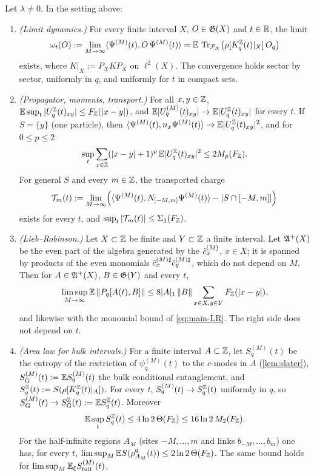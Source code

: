 \begin{theorem}\label{thm:infvol}
Let $\lambda\neq0$.  In the setting above:
\begin{enumerate}[label=(\alph*)]
\item \emph{(Limit dynamics.)}  For every finite interval $X$, $O\in\mathfrak{G}(X)$ and $t\in\mathbb{R}$, the limit
\[
  \omega_t(O):=\lim_{M\to\infty}\langle\Psi^{(M)}(t),O\,\Psi^{(M)}(t)\rangle=\mathbb{E}\,\operatorname{Tr}_{\mathcal{F}_X}\bigl(\rho[K^{\mathbb{Z}}_q(t)|_X]\,O_q\bigr)
\]
exists, where $K|_X:=P_XKP_X$ on $\ell^2(X)$.  The convergence holds sector by sector, uniformly in $q$, and
uniformly for $t$ in compact sets.
\item \emph{(Propagator, moments, transport.)}  For all $x,y\in\mathbb{Z}$, $\mathbb{E}\sup_t|U^{\mathbb{Z}}_q(t)_{xy}|\le F_{\mathbb{Z}}(|x-y|)$, and
$\mathbb{E}|U^{(M)}_q(t)_{xy}|\to\mathbb{E}|U^{\mathbb{Z}}_q(t)_{xy}|$ for every $t$.  If $S=\{y\}$ (one particle), then
$\langle\Psi^{(M)}(t),n_x\Psi^{(M)}(t)\rangle\to\mathbb{E}|U^{\mathbb{Z}}_q(t)_{xy}|^2$, and for $0\le p\le2$
\[
  \sup_t\sum_{x\in\mathbb{Z}}(|x-y|+1)^p\,\mathbb{E}|U^{\mathbb{Z}}_q(t)_{xy}|^2\le2M_p(F_{\mathbb{Z}}).
\]  For general $S$ and every $m\in\mathbb{Z}$, the
transported charge
\[
  \mathcal T_m(t):=\lim_{M\to\infty}\Bigl(\langle\Psi^{(M)}(t),N_{[-M,m]}\Psi^{(M)}(t)\rangle-|S\cap[-M,m]|\Bigr)
\]
exists for every $t$, and $\sup_t|\mathcal T_m(t)|\le\Sigma_1(F_{\mathbb{Z}})$.
\item \emph{(Lieb--Robinson.)}  Let $X\subset\mathbb{Z}$ be finite and $Y\subset\mathbb{Z}$ a finite interval.  Let $\mathfrak{A}^+(X)$ be the
even part of the algebra generated by the $\tilde c^{(M)}_x$, $x\in X$; it is spanned by products of the even monomials
$\tilde c^{(M)\sharp}_x\tilde c^{(M)\sharp}_y$, which do not depend on $M$.  Then for $A\in\mathfrak{A}^+(X)$, $B\in\mathfrak{G}(Y)$ and every $t$,
\[
  \limsup_{M\to\infty}\mathbb{E}\left\|P_q[A(t),B]\right\|\le8|A|_1\left\|B\right\|\sum_{x\in X,y\in Y}F_{\mathbb{Z}}(|x-y|),
\]
and likewise with the monomial bound of \eqref{eq:main-LR}.  The right side does not depend on $t$.
\item \emph{(Area law for bulk intervals.)}  For a finite interval $A\subset\mathbb{Z}$, let $S^{(M)}_q(t)$ be the entropy of
the restriction of $\psi^{(M)}_q(t)$ to the $c$-modes in $A$ (\cref{lem:slater}), $S_{\mathrm{G}}^{(M)}(t):=\mathbb{E} S^{(M)}_q(t)$ the
bulk conditional entanglement, and $S^{\mathbb{Z}}_q(t):=S(\rho[K^{\mathbb{Z}}_q(t)|_A])$.  For every $t$, $S^{(M)}_q(t)\to S^{\mathbb{Z}}_q(t)$
uniformly in $q$, so $S_{\mathrm{G}}^{(M)}(t)\to S_{\mathrm{G}}^{\mathbb{Z}}(t):=\mathbb{E} S^{\mathbb{Z}}_q(t)$.  Moreover
\[
  \mathbb{E}\sup_tS^{\mathbb{Z}}_q(t)\le4\ln2\,\Theta(F_{\mathbb{Z}})\le16\ln2\,M_2(F_{\mathbb{Z}}).
\]
For the half-infinite regions $A_M$ (sites $-M,\dots,m$ and links $b_{-M},\dots,b_m$) one has, for every $t$,
$\limsup_M\mathbb{E} S(\rho^{q}_{A_M}(t))\le2\ln2\,\Theta(F_{\mathbb{Z}})$.  The same bound holds for $\limsup_M\mathbb{E}_\xi S_{\mathrm{full}}^{(M)}(t)$,

\end{enumerate}
\end{theorem}
